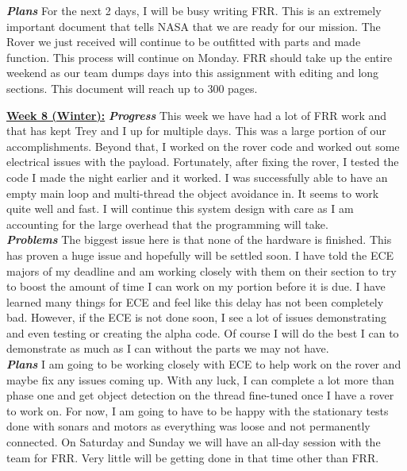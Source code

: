 \documentclass[onecolumn, draftclsnofoot, 10pt, compsoc]{IEEEtran}
\begin{document}
\newline\textbf{\textit{{Plans}}}
\newline For the next 2 days, I will be busy writing FRR. This is an extremely important document that tells NASA that we are ready for our mission. The Rover we just received will continue to be outfitted with parts and made function. This process will continue on Monday. FRR should take up the entire weekend as our team dumps days into this assignment with editing and long sections. This document will reach up to 300 pages. \newline

\underline{\textbf{Week 8 (Winter):}}
\newline\textbf{\textit{{Progress}}}
\newline This week we have had a lot of FRR work and that has kept Trey and I up for multiple days. This was a large portion of our accomplishments.  Beyond that, I worked on the rover code and worked out some electrical issues with the payload. Fortunately, after fixing the rover, I tested the code I made the night earlier and it worked. I was successfully able to have an empty main loop and multi-thread the object avoidance in. It seems to work quite well and fast. I will continue this system design with care as I am accounting for the large overhead that the programming will take.\\
\newline\textbf{\textit{{Problems}}}
\newline The biggest issue here is that none of the hardware is finished. This has proven a huge issue and hopefully will be settled soon. I have told the ECE majors of my deadline and am working closely with them on their section to try to boost the amount of time I can work on my portion before it is due. I have learned many things for ECE and feel like this delay has not been completely bad. However, if the ECE is not done soon, I see a lot of issues demonstrating and even testing or creating the alpha code. Of course I will do the best I can to demonstrate as much as I can without the parts we may not have. \\
\newline\textbf{\textit{{Plans}}}
\newline I am going to be working closely with ECE to help work on the rover and maybe fix any issues coming up. With any luck, I can complete a lot more than phase one and get object detection on the thread fine-tuned once I have a rover to work on. For now, I am going to have to be happy with the stationary tests done with sonars and motors as everything was loose and not permanently connected. On Saturday and Sunday we will have an all-day session with the team for FRR. Very little will be getting done in that time other than FRR. \newline
\end{document}
